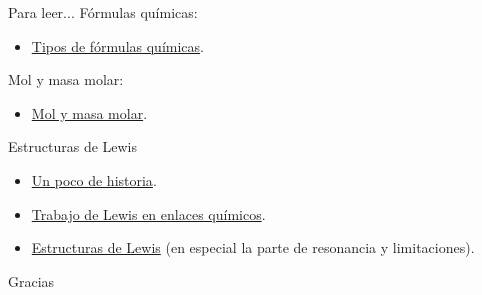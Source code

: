 \documentclass{beamer}
\begin{document}
\begin{frame}{Para leer...}
  Fórmulas químicas:
  \begin{itemize}
    \item \href{https://en.wikipedia.org/wiki/Chemical_formula\#Types}{Tipos de fórmulas químicas}.
  \end{itemize}
  Mol y masa molar:
  \begin{itemize}
    \item \href{https://www.bipm.org/documents/20126/41483022/SI-Brochure-9.pdf}{Mol y masa molar}.
  \end{itemize}
  Estructuras de Lewis
  \begin{itemize}
    \item \href{https://en.wikipedia.org/wiki/History_of_molecular_theory}{Un poco de historia}.
    \item \href{https://en.wikipedia.org/wiki/Gilbert_N._Lewis\#Valence_theory}{Trabajo de Lewis en enlaces químicos}.
    \item \href{https://en.wikipedia.org/wiki/Lewis_structure}{Estructuras de Lewis} (en especial la parte de resonancia y limitaciones).
  \end{itemize}
\end{frame}
\begin{frame}[standout]{}
  Gracias
\end{frame}
\end{document}
